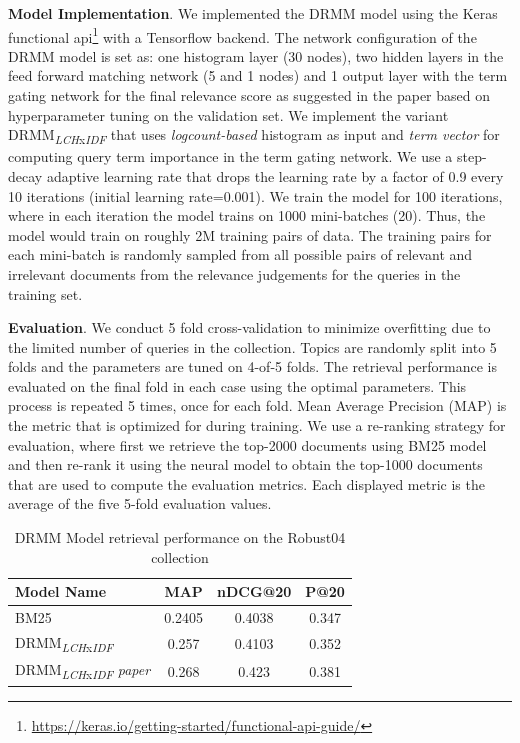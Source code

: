 \textbf{Model Implementation}. We implemented the DRMM model using the Keras functional api\footnote{\url{https://keras.io/getting-started/functional-api-guide/}} with a Tensorflow backend. The network configuration of the DRMM model is set as: one histogram layer (30 nodes), two hidden layers in the feed forward matching network (5 and 1 nodes) and 1 output layer with the term gating network for the final relevance score as suggested in the paper based on hyperparameter tuning on the validation set. We implement the variant DRMM\textsubscript{\textit{LCH}x\textit{IDF}} that uses \textit{logcount-based} histogram as input and \textit{term vector} for computing query term importance in the term gating network. We use a step-decay adaptive learning rate that drops the learning rate by a factor of 0.9 every 10 iterations (initial learning rate=0.001). We train the model for 100 iterations, where in each iteration the model trains on 1000 mini-batches (20). Thus, the model would train on roughly 2M training pairs of data. The training pairs for each mini-batch is randomly sampled from all possible pairs of relevant and irrelevant documents from the relevance judgements for the queries in the training set. 

\textbf{Evaluation}. We conduct 5 fold cross-validation to minimize overfitting due to the limited number of queries in the collection. Topics are randomly split into 5 folds and the parameters are tuned on 4-of-5 folds. The retrieval performance is evaluated on the final fold in each case using the optimal parameters. This process is repeated 5 times, once for each fold. Mean Average Precision (MAP) is the metric that is optimized for during training. We use a re-ranking strategy for evaluation, where first we retrieve the top-2000 documents using BM25 model and then re-rank it using the neural model to obtain the top-1000 documents that are used to compute the evaluation metrics. Each displayed metric is the average of the five 5-fold evaluation values.

\begin{table}[]
    \centering
    \begin{tabular}{lccc}
    \toprule
        Model Name & MAP & nDCG@20 & P@20 \\
        \midrule
        BM25 & 0.2405 & 0.4038 & 0.347 \\
        DRMM\textsubscript{\textit{LCH}x\textit{IDF}} & 0.257 & 0.4103 & 0.352 \\
        DRMM\textsubscript{\textit{LCH}x\textit{IDF}} \textit{paper} & 0.268 & 0.423 & 0.381\\
    \bottomrule
    \end{tabular}
    \caption{DRMM Model retrieval performance on the Robust04 collection}
    \label{tab:drmm_eval}
\end{table}

